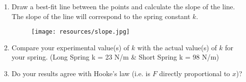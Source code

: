 \begin{enumerate}
  \item Draw a best-fit line between the points and calculate the slope of the line.
        The slope of the line will correspond to the spring constant $k$.

			\begin{center}
				\begin{figure}[h!]
					\centerline{\texttt{[image: resources/slope.jpg]}}
				\end{figure}
			\end{center}

			\begin{center}
			\end{center}

  \item Compare your experimental value(s) of $k$ with the actual value(s) of $k$ for 
        your spring. (Long Spring k = 23 N/m \& Short Spring k = 98 N/m)
				
			\begin{center}
			\end{center}
	
  \item Do your results agree with Hooke's law (i.e. is $F$ directly proportional to 
        $x$)?

			\begin{center}
			\end{center}

\end{enumerate}
